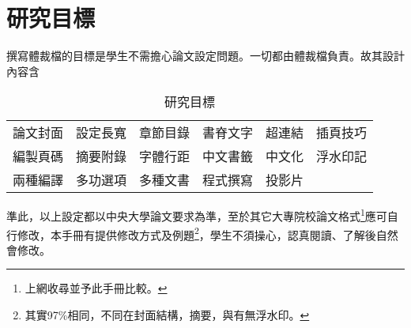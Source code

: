 \section{研究目標}
撰寫體裁檔的目標是學生不需擔心論文設定問題。一切都由體裁檔負責。故其設計內容含 \par
\begin{table}[!hbt]
\centering             {}
\caption{研究目標}
\begin{tabular}{cccccc}\\
論文封面 & 設定長寬 & 章節目錄 & 書脊文字 & 超連結 & 插頁技巧\\ 
編製頁碼 & 摘要附錄 & 字體行距 & 中文書籤 & 中文化 & 浮水印記\\
兩種編譯 & 多功選項 & 多種文書 & 程式撰寫 & 投影片\\
\end{tabular}
\end{table}

	準此，以上設定都以中央大學論文要求為準，至於其它大專院校論文格式\footnote{上網收尋並予此手冊比較。}應可自行修改，本手冊有提供修改方式及例題\footnote{其實97\%相同，不同在封面結構，摘要，與有無浮水印。}，學生不須操心，認真閱讀、了解後自然會修改。
